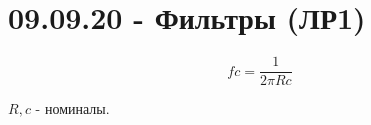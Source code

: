 



\section{09.09.20 - Фильтры (ЛР1)}

\[
fc = \frac{1}{2 \pi R c}
\]

$R, c$ - номиналы.



\newpage

\tableofcontents

